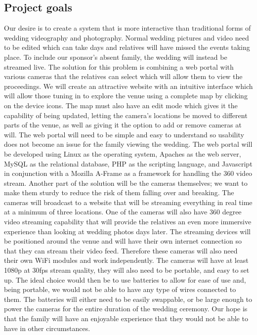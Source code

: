 \documentclass[onecolumn, draftclsnofoot,10pt, compsoc]{IEEEtran}
\begin{document}
    \subsection{Project goals}
     Our desire is to create a system that is more interactive than traditional forms of wedding videography and photography.
    Normal wedding pictures and video need to be edited which can take days and relatives will have missed the events taking place.
    To include our sponsor's absent family, the wedding will instead be streamed live. 
    The solution for this problem is combining a web portal with various cameras that the relatives can select which will allow them to view the proceedings.
    We will create an attractive website with an intuitive interface which will allow those tuning in to explore the venue using a complete map by clicking on the device icons. 
    The map must also have an edit mode which gives it the capability of being updated, letting the camera's locations be moved to different parts of the venue, as well as giving it the option to add or remove cameras at will.
    The web portal will need to be simple and easy to understand so usability does not become an issue for the family viewing the wedding.
    The web portal will be developed using Linux as the operating system, Apaches as the web server, MySQL as the relational database, PHP as the scripting language, and Javascript in conjunction with a Mozilla A-Frame as a framework for handling the 360 video stream. 
\newline
\newline
    Another part of the solution will be the cameras themselves; we want to make them sturdy to reduce the risk of them falling over and breaking. 
    The cameras will broadcast to a website that will be streaming everything in real time at a minimum of three locations. 
    One of the cameras will also have 360 degree video streaming capability that will provide the relatives an even more immersive experience than looking at wedding photos days later. 
    The streaming devices will be positioned around the venue and will have their own internet connection so that they can stream their video feed.
    Therefore these cameras will also need their own WiFi modules and work independently.
    The cameras will have at least 1080p at 30fps stream quality, they will also need to be portable, and easy to set up.
    The ideal choice would then be to use batteries to allow for ease of use and, being portable, we would not be able to have any type of wires connected to them.
    The batteries will either need to be easily swappable, or be large enough to power the cameras for the entire duration of the wedding ceremony.
    Our hope is that the family will have an enjoyable experience that they would not be able to have in other circumstances.
    \pagebreak 
\end{document}
